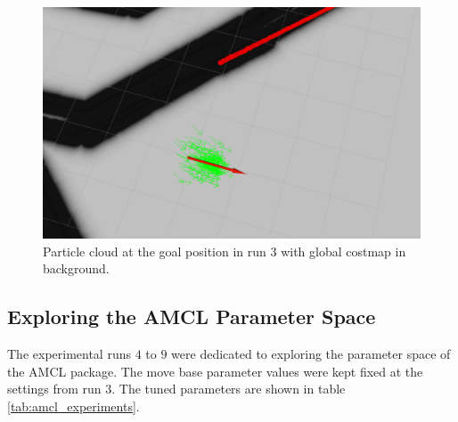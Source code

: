 \documentclass[10pt,journal,compsoc]{IEEEtran}
\begin{document}
\begin{figure}[thpb]
      \centering
      \includegraphics[width=\linewidth]{images/run_3_goal.PNG}
      \caption{Particle cloud at the goal position in run 3 with global costmap in background.}
      \label{fig:result_experiment_3}
\end{figure}

\subsection{Exploring the AMCL Parameter Space}
The experimental runs $4$ to $9$ were dedicated to exploring the parameter space of the AMCL package. The move base parameter values were kept fixed at the settings from run $3$. The tuned parameters are shown in table \ref{tab:amcl_experiments}.
\end{document}
